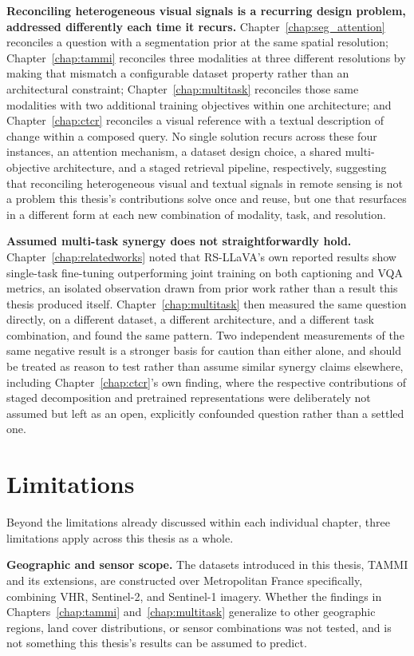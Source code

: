 \textbf{Reconciling heterogeneous visual signals is a recurring design problem, addressed differently each time it recurs.} Chapter~\ref{chap:seg_attention} reconciles a question with a segmentation prior at the same spatial resolution; Chapter~\ref{chap:tammi} reconciles three modalities at three different resolutions by making that mismatch a configurable dataset property rather than an architectural constraint; Chapter~\ref{chap:multitask} reconciles those same modalities with two additional training objectives within one architecture; and Chapter~\ref{chap:ctcr} reconciles a visual reference with a textual description of change within a composed query. No single solution recurs across these four instances, an attention mechanism, a dataset design choice, a shared multi-objective architecture, and a staged retrieval pipeline, respectively, suggesting that reconciling heterogeneous visual and textual signals in remote sensing is not a problem this thesis's contributions solve once and reuse, but one that resurfaces in a different form at each new combination of modality, task, and resolution.

\textbf{Assumed multi-task synergy does not straightforwardly hold.} Chapter~\ref{chap:relatedworks} noted that RS-LLaVA's own reported results show single-task fine-tuning outperforming joint training on both captioning and VQA metrics, an isolated observation drawn from prior work rather than a result this thesis produced itself. Chapter~\ref{chap:multitask} then measured the same question directly, on a different dataset, a different architecture, and a different task combination, and found the same pattern. Two independent measurements of the same negative result is a stronger basis for caution than either alone, and should be treated as reason to test rather than assume similar synergy claims elsewhere, including Chapter~\ref{chap:ctcr}'s own finding, where the respective contributions of staged decomposition and pretrained representations were deliberately not assumed but left as an open, explicitly confounded question rather than a settled one.

\section{Limitations}
\label{sec:conclusion_limitations}

Beyond the limitations already discussed within each individual chapter, three limitations apply across this thesis as a whole.

\textbf{Geographic and sensor scope.} The datasets introduced in this thesis, TAMMI and its extensions, are constructed over Metropolitan France specifically, combining VHR, Sentinel-2, and Sentinel-1 imagery. Whether the findings in Chapters~\ref{chap:tammi} and~\ref{chap:multitask} generalize to other geographic regions, land cover distributions, or sensor combinations was not tested, and is not something this thesis's results can be assumed to predict.

